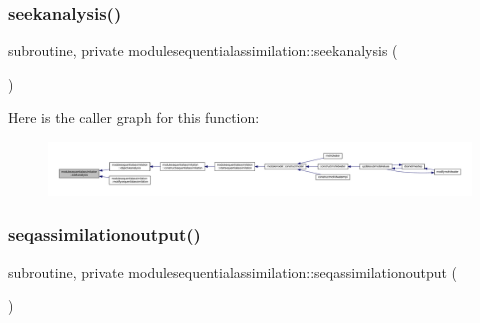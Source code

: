 \subsubsection{\texorpdfstring{seekanalysis()}{seekanalysis()}}
{\footnotesize\ttfamily subroutine, private modulesequentialassimilation\+::seekanalysis (\begin{DoxyParamCaption}{ }\end{DoxyParamCaption})\hspace{0.3cm}{\ttfamily [private]}}

Here is the caller graph for this function\+:\nopagebreak
\begin{figure}[H]
\begin{center}
\leavevmode
\includegraphics[width=350pt]{namespacemodulesequentialassimilation_a1cda513ededcf93d8f84bd9f6e39ba43_icgraph}
\end{center}
\end{figure}
\mbox{\label{namespacemodulesequentialassimilation_a80cfe86b207ec25cc26de13d8bad205c}} 
\subsubsection{\texorpdfstring{seqassimilationoutput()}{seqassimilationoutput()}}
{\footnotesize\ttfamily subroutine, private modulesequentialassimilation\+::seqassimilationoutput (\begin{DoxyParamCaption}{ }\end{DoxyParamCaption})\hspace{0.3cm}{\ttfamily [private]}}

